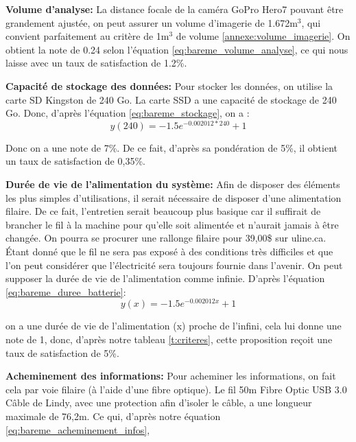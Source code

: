 \textbf{Volume d'analyse:} La distance focale de la caméra GoPro Hero7 pouvant être grandement ajustée, on peut assurer un volume d’imagerie de 1.672m$^3$, qui convient parfaitement au critère de 1m$^3$ de volume \ref{annexe:volume_imagerie}.  On obtient la note de 0.24 selon l'équation \ref{eq:bareme_volume_analyse}, ce qui nous laisse avec un taux de satisfaction de 1.2\%.
\vspace{5mm}



\textbf{Capacité de stockage des données:}
Pour stocker les données, on utilise la carte SD Kingston de 240 Go. La carte SSD a une capacité de stockage de 240 Go. Donc, d'après l'équation \ref{eq:bareme_stockage}, on a :
\begin{equation}
    y(240) = -1.5e^{-0.002012*240} + 1
\end{equation}

Donc on a une note de 7\%. De ce fait, d'après sa pondération de 5\%, il obtient un taux de satisfaction de 0,35\%.
\vspace{5mm}


\textbf{Durée de vie de l'alimentation du système:} Afin de disposer des éléments les plus simples d'utilisations, il serait nécessaire de disposer d'une alimentation filaire. De ce fait, l'entretien serait beaucoup plus basique car il suffirait de brancher le fil à la machine pour qu'elle soit alimentée et n'aurait jamais à être changée. On pourra se procurer une rallonge filaire pour 39,00\$ sur uline.ca. Étant donné que le fil ne sera pas exposé à des conditions très difficiles et que l'on peut considérer que l'électricité sera toujours fournie dans l'avenir. On peut supposer la durée de vie de l'alimentation comme infinie.
D'après l'équation \ref{eq:bareme_duree_batterie}:
\begin{equation}
    y(x) = -1.5e^{-0.002012x} + 1 
        \end{equation}

on a une durée de vie de l'alimentation (x) proche de l'infini, cela lui donne une note de 1, donc, d'après notre tableau \ref{t:criteres}, cette proposition reçoit une taux de satisfaction de 5\%.
\vspace{5mm}


\textbf{Acheminement des informations:}
Pour acheminer les informations, on fait cela par voie filaire (à l'aide d'une fibre optique). Le fil 50m Fibre Optic USB 3.0 Câble de Lindy, avec une protection afin d'isoler le câble, a une longueur maximale de 76,2m. Ce qui, d'après notre équation \ref{eq:bareme_acheminement_infos},

